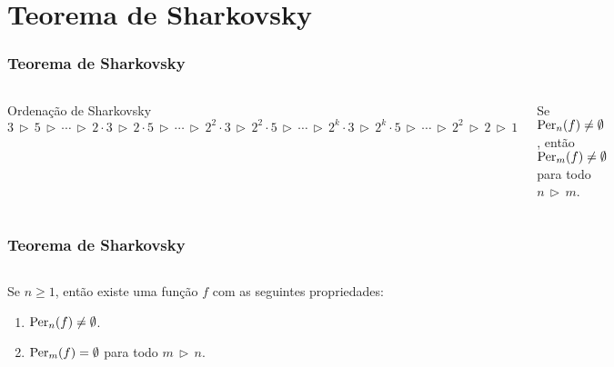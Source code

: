 \section{Teorema de Sharkovsky}


\begin{frame}
\vspace{5pt}
\frametitle{Teorema de Sharkovsky}
\begin{columns}
\column{\dimexpr\paperwidth-15pt}

\begin{definition}{Ordenação de Sharkovsky}
$3 \, \triangleright \, 5 
\, \triangleright \, \cdots \, \triangleright \,
2 \cdot 3 \, \triangleright \, 2 \cdot 5 
\, \triangleright \, \cdots \, \triangleright \,
2^2 \cdot 3 \, \triangleright \, 2^2 \cdot 5
\, \triangleright \, \cdots \, \triangleright \,
2^k \cdot 3 \, \triangleright \, 2^k \cdot 5
\, \triangleright \, \cdots \, \triangleright \,
2^2 \, \triangleright \, 2 \, \triangleright \, 1$
\end{definition}

\pause

\begin{theorem}[Sharkovsky]
Se $\operatorname{Per}_n(f) \neq \emptyset$, então $\operatorname{Per}_m(f) \neq \emptyset$ para todo $n \, \triangleright \, m$.
\end{theorem}

\end{columns}
\end{frame}


\begin{frame}
\vspace{5pt}
\frametitle{Teorema de Sharkovsky}
\begin{columns}
\column{\dimexpr\paperwidth-15pt}

\begin{theorem}
Se $n \geq 1$, então existe uma função $f$ com as seguintes propriedades:
\begin{enumerate}
\item $\operatorname{Per}_n(f) \neq \emptyset$.
\item $\operatorname{Per}_m(f) =  \emptyset$ para todo $m \, \triangleright \, n$.
\end{enumerate}
\end{theorem}

\end{columns}
\end{frame}
